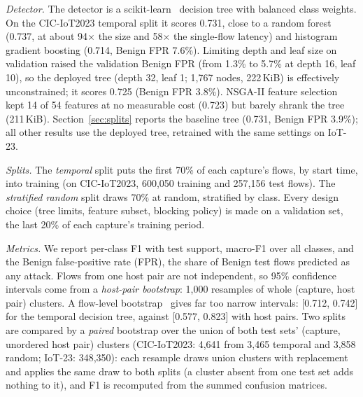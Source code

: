 \emph{Detector.} The detector is a scikit-learn~\cite{pedregosa2011sklearn} decision tree with balanced class weights. On the CIC-IoT2023 temporal split it scores 0.731, close to a random forest (0.737, at about 94$\times$ the size and 58$\times$ the single-flow latency) and histogram gradient boosting (0.714, Benign FPR 7.6\%). Limiting depth and leaf size on validation raised the validation Benign FPR (from 1.3\% to 5.7\% at depth 16, leaf 10), so the deployed tree (depth 32, leaf 1; 1,767 nodes, 222\,KiB) is effectively unconstrained; it scores 0.725 (Benign FPR 3.8\%). NSGA-II feature selection~\cite{deb2002nsga2,blank2020pymoo} kept 14 of 54 features at no measurable cost (0.723) but barely shrank the tree (211\,KiB). Section~\ref{sec:splits} reports the baseline tree (0.731, Benign FPR 3.9\%); all other results use the deployed tree, retrained with the same settings on IoT-23.

\emph{Splits.} The \emph{temporal} split puts the first 70\% of each capture's flows, by start time, into training (on CIC-IoT2023, 600,050 training and 257,156 test flows). The \emph{stratified random} split draws 70\% at random, stratified by class. Every design choice (tree limits, feature subset, blocking policy) is made on a validation set, the last 20\% of each capture's training period.

\emph{Metrics.} We report per-class F1 with test support, macro-F1 over all classes, and the Benign false-positive rate (FPR), the share of Benign test flows predicted as any attack. Flows from one host pair are not independent, so 95\% confidence intervals come from a \emph{host-pair bootstrap}: 1,000 resamples of whole (capture, host pair) clusters. A flow-level bootstrap~\cite{efron1994bootstrap} gives far too narrow intervals: [0.712, 0.742] for the temporal decision tree, against [0.577, 0.823] with host pairs. Two splits are compared by a \emph{paired} bootstrap over the union of both test sets' (capture, unordered host pair) clusters (CIC-IoT2023: 4,641 from 3,465 temporal and 3,858 random; IoT-23: 348,350): each resample draws union clusters with replacement and applies the same draw to both splits (a cluster absent from one test set adds nothing to it), and F1 is recomputed from the summed confusion matrices.
